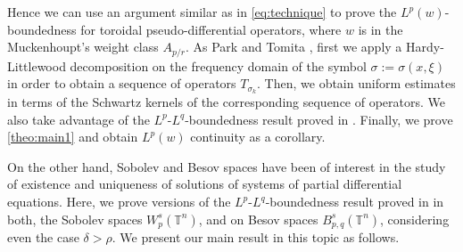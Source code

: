 \documentclass[12pt, reqno]{amsart}
\theoremstyle{definition}
\theoremstyle{remark}
\numberwithin{equation}{section}
\begin{document}
Hence we can use an argument similar as in \cref{eq:technique} to prove the $L^p(w)$-boundedness for toroidal pseudo-differential operators, where $w$ is in the Muckenhoupt's weight class $A_{p/r}$. As Park and Tomita \cite{park-tomita}, first we apply a Hardy-Littlewood decomposition on the frequency domain of the symbol $\sigma := \sigma(x, \xi)$ in order to obtain a sequence of operators $T_{\sigma_k}$. Then, we obtain uniform estimates in terms of the Schwartz kernels of the corresponding sequence of operators. We also take advantage of the $L^p$-$L^q$-boundedness result proved in \cite{Cardona:Martinez}. Finally, we prove \cref{theo:main1} and obtain $L^p(w)$ continuity as a corollary. 

On the other hand, Sobolev and Besov spaces have been of interest in the study of existence and uniqueness of solutions of systems of partial differential equations. Here, we prove versions of the $L^p$-$L^q$-boundedness result proved in \cite{Cardona:Martinez} in both, the Sobolev spaces $W^s_p(\mathbb{T}^n)$, and on Besov spaces $B^s_{p,q}(\mathbb{T}^n)$, considering even the case $\delta > \rho$. We present our main result in this topic as follows.
\end{document}

